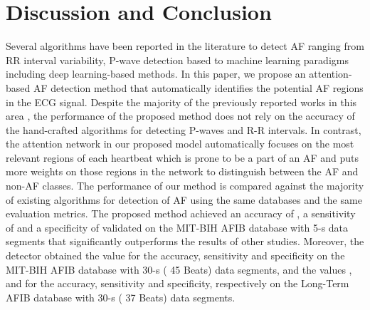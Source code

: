 \documentclass[conference]{IEEEtran}
\begin{document}
\begin{table*}  
\caption{Detection performances of the proposed method on different PhysioNet databases with the ECG segment of size 30-s.}
\end{table*}


\section{Discussion and Conclusion}
\label{sec:dis_con}
Several algorithms have been reported in the literature to detect AF  ranging from RR interval variability, P-wave detection based to machine learning paradigms including deep learning-based methods. In this paper, we propose an attention-based AF detection method that automatically identifies the potential AF regions in the ECG signal.
Despite the majority of the previously reported works in this area \cite{huang2011novel,lee2013atrial,babaeizadeh2009improvements,jiang2012high}, the performance of the proposed method does not rely on the accuracy of the hand-crafted algorithms for detecting P-waves and R-R intervals. In contrast, the attention network in our proposed model automatically focuses on the most relevant regions of each heartbeat which is prone to be a part of an AF and puts more weights on those regions in the network to distinguish between the AF and non-AF classes. The performance of our method is compared against the majority of existing algorithms for detection of  AF using the same databases and the same evaluation metrics. The proposed method achieved an accuracy of , a sensitivity of  and a specificity of  validated on the MIT-BIH AFIB database with 5-s data segments that significantly outperforms the results of other studies. Moreover, the detector obtained the value  for the accuracy, sensitivity and specificity on the MIT-BIH AFIB database with 30-s ( 45 Beats) data segments, and the values ,  and  for the accuracy, sensitivity and specificity, respectively on the Long-Term AFIB database with 30-s ( 37 Beats) data segments.
\end{document}
